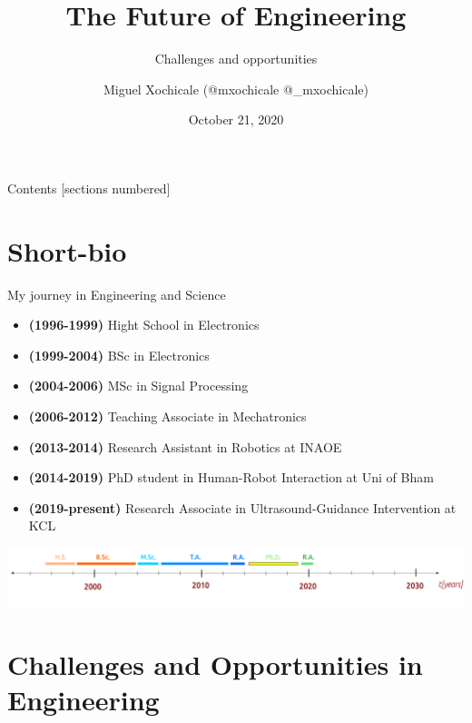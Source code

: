 \documentclass[xcolor={dvipsnames},aspectratio=169,10pt]{beamer}
\title{The Future of Engineering}
\subtitle{Challenges and opportunities }
\author{Miguel Xochicale  (\faGithub @mxochicale  \faTwitter @\_mxochicale) 
}
\date{October 21, 2020}
\begin{document}
\maketitle

\begin{frame}{Contents}
  [sections numbered]
  \tableofcontents[hideallsubsections]
\end{frame}


\section{Short-bio}

\begin{frame}{My journey in Engineering and Science}

\begin{itemize}	
	\item \textbf{(1996-1999)} Hight School in Electronics
	\item \textbf{(1999-2004)} BSc in Electronics  
	\item \textbf{(2004-2006)} MSc in Signal Processing 
	\item \textbf{(2006-2012)} Teaching Associate in Mechatronics 
	\item \textbf{(2013-2014)} Research Assistant in Robotics at INAOE  
	\item \textbf{(2014-2019)} PhD student in Human-Robot Interaction at Uni of Bham \\
	\item \textbf{(2019-present)} Research Associate in Ultrasound-Guidance 
	Intervention at KCL 
\end{itemize}

	\vspace{4mm}
        \includegraphics[width=\linewidth]{./figs/myjourney/versions/drawing.png}

\end{frame}


\section{Challenges and Opportunities in Engineering}
\end{document}

